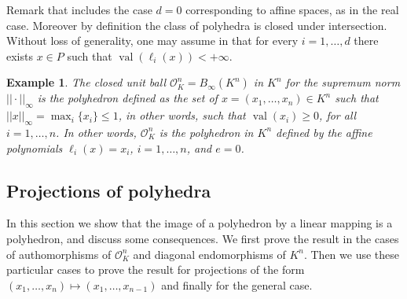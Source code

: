 \documentclass[a4paper,12pt]{article}
\newtheorem{example}[theorem]{Example}
\newcommand{\aff}[1]{{\text{aff}(#1)}} %
\newcommand{\relint}[1]{{\text{relint}(#1)}} %
\newcommand{\simone}[1]{{\color{blue} #1}} %
\DeclareMathOperator{\val}{val}
\newcommand{\OK}{\mathcal{O}_K}
\begin{document}
Remark that  includes the case $d=0$ corresponding to affine spaces, as in the real case.
Moreover by definition the class of polyhedra is closed under intersection. Without loss of generality, one may
assume in  that for every $i=1,\ldots,d$ there exists $x \in P$ such that
$\val(\ell_i(x))<+\infty$.

\begin{example}
  The \emph{closed unit ball} $\OK^n=B_\infty(K^n)$ in $K^n$ for the supremum norm $||\cdot||_{\infty}$ is the
  polyhedron defined as the set of $x=(x_1,\ldots,x_n) \in K^n$ such that $||x||_{\infty} =
  \max_i\{x_i\} \leq 1$, in other words, such that $\val(x_i) \geq 0$, for all $i=1, \ldots, n$.
  In other words, $\OK^n$ is the polyhedron in $K^n$ defined by the affine polynomials
  $\ell_i(x)=x_i$, $i=1,\ldots, n$, and $e=0$. %
\end{example}

\subsection{Projections of polyhedra}


In this section we show that the image of a polyhedron by a linear mapping is a polyhedron,
and discuss some consequences.
We first prove the result in the cases of authomorphisms of $\OK^n$ and diagonal endomorphisms of $K^n$.
Then we use these particular cases to prove the result for projections of the form
$(x_1,\dots,x_n) \mapsto (x_1,\dots, x_{n-1})$ and finally for the general case.
\end{document}
